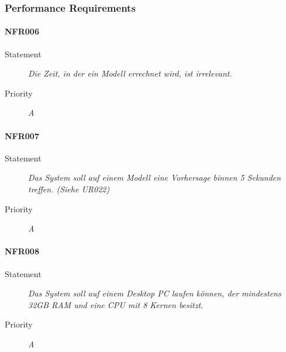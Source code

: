 \subsubsection{Performance Requirements}

\paragraph{NFR006}
\begin{description}
\item[Statement] \textit{Die Zeit, in der ein Modell errechnet wird, ist irrelevant.}
\item[Priority] \textit{A}
\end{description}

\paragraph{NFR007}
\begin{description}
\item[Statement] \textit{Das System soll auf einem Modell eine Vorhersage binnen 5 Sekunden treffen.
(Siehe UR022)}
\item[Priority] \textit{A}
\end{description}

\paragraph{NFR008}
\begin{description}
\item[Statement] \textit{Das System soll auf einem Desktop PC laufen können, der mindestens 32GB RAM und eine CPU mit 8 Kernen besitzt.}
\item[Priority] \textit{A}
\end{description}